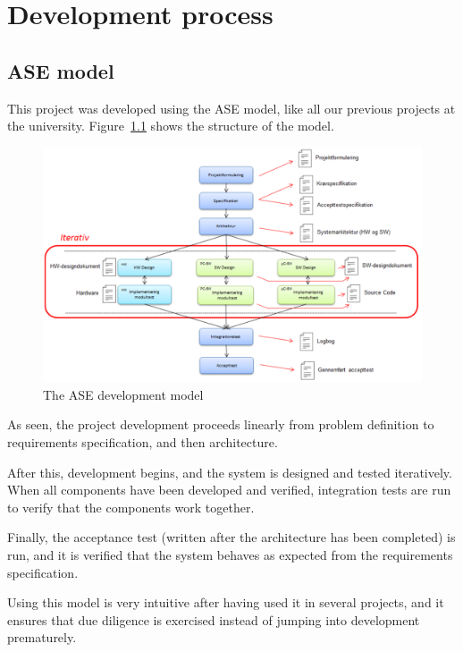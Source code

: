 \chapter{Development process}

\section{ASE model}
This project was developed using the ASE model, like all our previous projects at the university. Figure~\ref{fig:asemodel} shows the structure of the model.

\begin{figure}[H]
\centering
\includegraphics[width=1\linewidth]{ASE_model}
\caption{The ASE development model\cite{ASE_model}}
\label{fig:asemodel}
\end{figure}

 As seen, the project development proceeds linearly from problem definition to requirements specification, and then architecture. 
 
 After this, development begins, and the system is designed and tested iteratively. When all components have been developed and verified, integration tests are run to verify that the components work together.
 
  Finally, the acceptance test (written after the architecture has been completed) is run, and it is verified that the system behaves as expected from the requirements specification.
  
  Using this model is very intuitive after having used it in several projects, and it ensures that due diligence is exercised instead of jumping into development prematurely.
  

